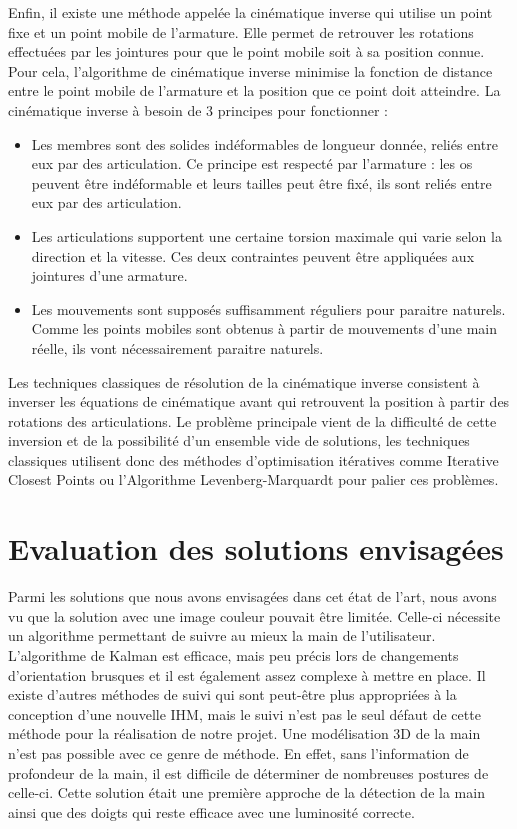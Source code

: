Enfin, il existe une méthode appelée la cinématique inverse qui utilise un point fixe et un point mobile de l'armature. Elle permet de retrouver les rotations effectuées par les jointures pour que le point mobile soit à sa position connue. Pour cela, l'algorithme de cinématique inverse minimise la fonction de distance entre le point mobile de l'armature et la position que ce point doit atteindre.
La cinématique inverse à besoin de 3 principes pour fonctionner : 

\begin{itemize}
	\item Les membres sont des solides indéformables de longueur donnée, reliés entre eux par des articulation. Ce principe est respecté par l'armature : les os peuvent être indéformable et leurs tailles peut être fixé, ils sont reliés entre eux par des articulation.
	\item Les articulations supportent une certaine torsion maximale qui varie selon la direction et la vitesse. Ces deux contraintes peuvent être appliquées aux jointures d'une armature.
	\item Les mouvements sont supposés suffisamment réguliers pour paraitre naturels. Comme les points mobiles sont obtenus à partir de mouvements d'une main réelle, ils vont nécessairement paraitre naturels.
\end{itemize}

Les techniques classiques de résolution de la cinématique inverse consistent à inverser les équations de cinématique avant qui retrouvent la position à partir des rotations des articulations. 
Le problème principale vient de la difficulté de cette inversion et de la possibilité d'un ensemble vide de solutions, les techniques classiques utilisent donc des méthodes d'optimisation itératives comme Iterative Closest Points ou l'Algorithme Levenberg-Marquardt pour palier ces problèmes.

\section{Evaluation des solutions envisagées}
Parmi les solutions que nous avons envisagées dans cet état de l'art, nous avons vu que la solution avec une 
image couleur pouvait être limitée. Celle-ci nécessite un algorithme permettant de suivre au mieux
la main de l'utilisateur. L'algorithme de Kalman est efficace, mais peu précis lors de changements d'orientation
brusques et il est également assez complexe à mettre en place. Il existe d'autres méthodes de suivi qui sont
peut-être plus appropriées à la conception d'une nouvelle IHM, mais le suivi n'est pas le seul défaut de cette
méthode pour la réalisation de notre projet. Une 
modélisation 3D de la main n'est pas possible avec ce genre de méthode. En effet, sans l'information de 
profondeur de la main, il est difficile de déterminer de nombreuses postures de celle-ci. Cette solution était une première approche de la 
détection de la main ainsi que des doigts qui reste efficace avec une luminosité correcte.\\

